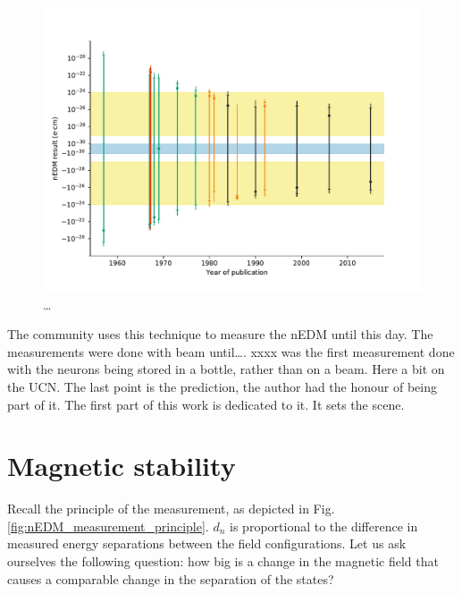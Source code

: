 \begin{figure}
  \centering
  \includegraphics[width=\linewidth]{gfx/introduction/edm_limits.pdf}
  \caption{\ldots {}  }
  \label{fig:nEDM_limits_history}
\end{figure}

The community uses this technique to measure the nEDM until this day. The measurements were done with beam until\ldots. xxxx was the first measurement done with the neurons being stored in a bottle, rather than on a beam. Here a bit on the UCN. The last point is the prediction, the author had the honour of being part of it. The first part of this work is dedicated to it. It sets the scene.


\section{Magnetic stability}
Recall the principle of the measurement, as depicted in Fig.\,\ref{fig:nEDM_measurement_principle}. $d_n$ is proportional to the difference in measured energy separations between the field configurations. Let us ask ourselves the following question: how big is a change in the magnetic field that causes a comparable change in the separation of the states?

